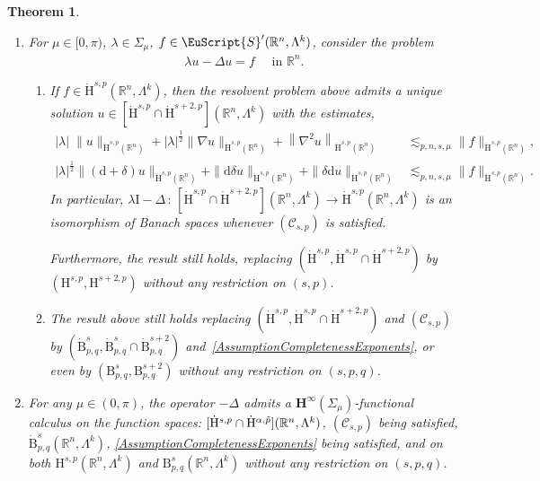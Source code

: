 \documentclass[10pt]{amsart}
\newtheorem{theo}{Theorem}[section]
\theoremstyle{definition}\newtheorem{defi}[theo]{Definition}\newtheorem{rema}[theo]{Remark}\newtheorem{exam}[theo]{Example}\newtheorem{exem}[theo]{Example}\newtheorem{nota}[theo]{Notation}
\newcommand{\bbR}{\mathbb{R}}
\newcommand{\rmH}{\mathrm{H}}%
\newcommand{\rmB}{\mathrm{B}}
\newcommand{\rmd}{\mathrm{d}}
\newcommand{\rmI}{\mathrm{I}}
\newcommand{\clC}{\mathcal{C}}
\newcommand{\bfH}{\mathbf{H}}
\newcommand{\eus}{\EuScript}
\let\oldtilde\tilde
\renewcommand*{\tilde}[1]{\mathchoice{\widetilde{#1}}{\widetilde{#1}}{\oldtilde{#1}}{\oldtilde{#1}}}
\begin{document}
\begin{theo}
\begin{enumerate}
\begin{enumerate}
\item\label{theo2.7.1.b} The result still holds if we replace $(\dot{\rmH}^{s,p},\dot{\rmH}^{\alpha,\tilde{p}},\dot{\rmH}^{s+2,p},\dot{\rmH}^{\alpha+2,\tilde{p}})$ by the Besov spaces $(\dot{\rmB}^{s}_{p,q}, \dot{\rmB}^{\alpha}_{\tilde{p},\tilde{q}},\dot{\rmB}^{s+2}_{p,q}, \dot{\rmB}^{\alpha+2}_{\tilde{p},\tilde{q}})$.
\end{enumerate}
\vspace*{3pt}
\item\label{theo2.7.2} For $\mu\in[0,\pi)$, $\lambda\in\Sigma_\mu$, $f\in \eus{S}'(\bbR^n,\Lambda^k)$, consider the problem
\begin{align*}
\lambda u - \Delta u = f\quad\text{ in } \bbR^n.
\end{align*}
\begin{enumerate}
\item\label{theo2.7.2.a} If $f\in \dot{\rmH}^{s,p}(\bbR^n,\Lambda^k)$, then the resolvent problem above admits a unique solution $u\in [\dot{\rmH}^{s,p}\cap \dot{\rmH}^{s+2,p}](\bbR^n,\Lambda^k)$ with the estimates,
\begin{align*}
|\lambda|\;\| u\|_{\dot{\rmH}^{s,p}(\bbR^n)}+|\lambda|^\frac{1}{2}\| \nabla u\|_{\dot{\rmH}^{s,p}(\bbR^n)}+\left\| \nabla^2 u\right\|_{\dot{\rmH}^{s,p}(\bbR^n)} &\lesssim_{p,n,s,\mu} \| f\|_{\dot{\rmH}^{s,p}(\bbR^n)},\\
|\lambda|^\frac{1}{2}\| (\rmd+\delta) u\|_{\dot{\rmH}^{s,p}(\bbR^n)}+\| \rmd\delta u\|_{\dot{\rmH}^{s,p}(\bbR^n)} + \| \delta\rmd u\|_{\dot{\rmH}^{s,p}(\bbR^n)} &\lesssim_{p,n,s,\mu} \| f\|_{\dot{\rmH}^{s,p}(\bbR^n)} .
\end{align*}
In particular, $\lambda \rmI -\Delta\,:\,[\dot{\rmH}^{s,p}\cap \dot{\rmH}^{s+2,{p}}](\bbR^n,\Lambda^k)\longrightarrow \dot{\rmH}^{s,p}(\bbR^n,\Lambda^k)$ is an isomorphism of Banach spaces whenever $(\clC_{s,p})$ is satisfied.

Furthermore, the result still holds, replacing $(\dot{\rmH}^{s,p},\dot{\rmH}^{s,p}\cap \dot{\rmH}^{s+2,{p}})$ by $({\rmH}^{s,p},{\rmH}^{s+2,p})$ without any restriction on $(s,p)$.

\item\label{theo2.7.2.b} The result above still holds replacing $(\dot{\rmH}^{s,p},\dot{\rmH}^{s,p}\cap \dot{\rmH}^{s+2,{p}})$ and $(\clC_{s,p})$ by $(\dot{\rmB}^{s}_{p,q},\dot{\rmB}^{s}_{p,q}\cap \dot{\rmB}^{s+2}_{p,q})$ and~\eqref{AssumptionCompletenessExponents}, or even by $({\rmB}^{s}_{p,q},{\rmB}^{s+2}_{p,q})$ without any restriction on $(s,p,q)$.
\end{enumerate}
\item\label{theo2.7.3} For any $\mu\in(0,\pi)$, the operator $-\Delta$ admits a $\bfH^\infty(\Sigma_\mu)$-functional calculus on the function spaces: $[\dot{\rmH}^{s,p}\cap \dot{\rmH}^{\alpha,\tilde{p}}](\bbR^n,\Lambda^k)$, $(\clC_{s,p})$ being satisfied, $\dot{\rmB}^{s}_{p,q}(\bbR^n,\Lambda^k)$, \eqref{AssumptionCompletenessExponents} being satisfied, and on both ${\rmH}^{s,p}(\bbR^n,\Lambda^k)$ and ${\rmB}^{s}_{p,q}(\bbR^n,\Lambda^k)$ without any restriction on $(s,p,q)$.
\end{enumerate}
\end{theo}
\end{document}
